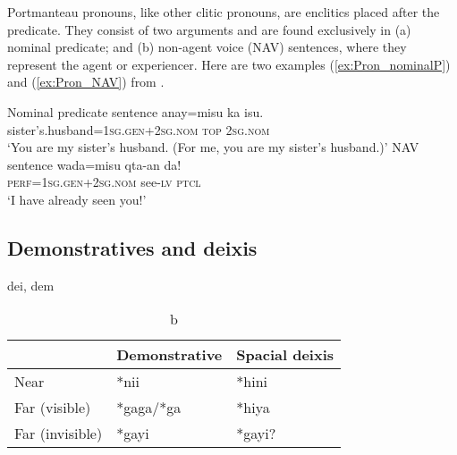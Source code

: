 Portmanteau pronouns, like other clitic pronouns, are enclitics placed after the predicate. They consist of two arguments and are found exclusively in (a) nominal predicate; and (b) non-agent voice (NAV) sentences, where they represent the agent or experiencer. Here are two examples (\ref{ex:Pron_nominalP}) and (\ref{ex:Pron_NAV}) from \textcite[74--75]{Lee2018Trugrammar}.

\begin{exe}

    \ex Nominal predicate sentence \label{ex:Pron_nominalP}
    \gll anay=misu ka isu. \\
    sister's.husband=\textsc{1sg.gen+2sg.nom} \textsc{top} \textsc{2sg.nom}\\
    \glt `You are my sister's husband. (For me, you are my sister's husband.)'
    \ex NAV sentence \label{ex:Pron_NAV}
    \gll wada=misu qta-an da! \\
    \textsc{perf}=\textsc{1sg.gen+2sg.nom} see-\textsc{lv} \textsc{ptcl}\\
    \glt `I have already seen you!'
\end{exe}



\subsection{Demonstratives and deixis}

\acl{dei}, \acl{dem}

\begin{table}[!htbp]
\centering
\caption{b}
\label{tab:psed_dem_dei}
\begin{tabular}{lll}
\hline
                & Demonstrative & Spacial deixis \\ \hline
Near            & *nii          & *hini          \\
Far (visible)   & *gaga/*ga     & *hiya          \\
Far (invisible) & *gayi         & *gayi?         \\ \hline
\end{tabular}
\end{table}

